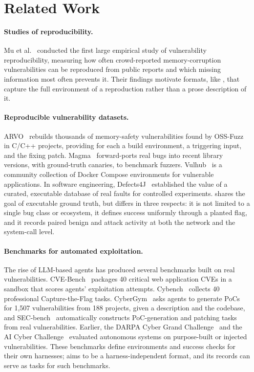 \section{Related Work}
\label{sec:related}

\paragraph{Studies of reproducibility.}
Mu et al.~\cite{mu2018reproducibility} conducted the first large empirical
study of vulnerability reproducibility, measuring how often crowd-reported
memory-corruption vulnerabilities can be reproduced from public reports and
which missing information most often prevents it. Their findings motivate
formats, like \cvex, that capture the full environment of a reproduction
rather than a prose description of it.

\paragraph{Reproducible vulnerability datasets.}
ARVO~\cite{mei2026arvo} rebuilds thousands of memory-safety vulnerabilities
found by OSS-Fuzz in C/C++ projects, providing for each a build environment,
a triggering input, and the fixing patch. Magma~\cite{hazimeh2020magma}
forward-ports real bugs into recent library versions, with ground-truth
canaries, to benchmark fuzzers. Vulhub~\cite{vulhub} is a community
collection of Docker Compose environments for vulnerable applications. In
software engineering, Defects4J~\cite{just2014defects4j} established the
value of a curated, executable database of real faults for controlled
experiments. \cvex shares the goal of executable ground truth, but differs in
three respects: it is not limited to a single bug class or ecosystem, it
defines success uniformly through a planted flag, and it records paired
benign and attack activity at both the network and the system-call level.

\paragraph{Benchmarks for automated exploitation.}
The rise of LLM-based agents has produced several benchmarks built on real
vulnerabilities. CVE-Bench~\cite{zhu2025cvebench} packages 40 critical web
application CVEs in a sandbox that scores agents' exploitation attempts.
Cybench~\cite{zhang2025cybench} collects 40 professional Capture-the-Flag
tasks. CyberGym~\cite{wang2026cybergym} asks agents to generate PoCs for 1,507
vulnerabilities from 188 projects, given a description and the codebase, and
SEC-bench~\cite{lee2025secbench} automatically constructs PoC-generation and
patching tasks from real vulnerabilities. Earlier, the DARPA Cyber Grand
Challenge~\cite{cgc} and the AI Cyber Challenge~\cite{aixcc} evaluated
autonomous systems on purpose-built or injected vulnerabilities. These
benchmarks define environments and success checks for their own harnesses;
\cvex aims to be a harness-independent format, and its records can serve as
tasks for such benchmarks.

